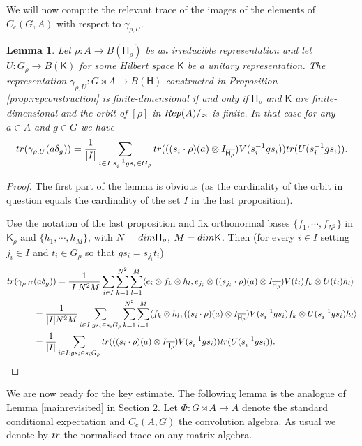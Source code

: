 \documentclass[11 pt, leqno, hidelinks]{amsart}%
\theoremstyle{plain}
\newtheorem{lemma}[theorem]{Lemma}
\numberwithin{equation}{section}
\newcommand{\tr}{\textup{tr}}
\newcommand{\Rep}{\textup{Rep}}
\newcommand{\Hil}{\mathsf{H}}
\newcommand{\Kil}{\mathsf{K}}
\begin{document}
We will now compute the relevant trace of the images of the elements of $C_c(G,A)$ with respect to $\gamma_{\rho,U}$.

\begin{lemma}\label{lem:trace}
	Let $\rho:A \to B(\Hil_\rho)$ be an irreducible representation and let $U:G_\rho \to B(\Kil)$ for some Hilbert space $\Kil$	be a unitary representation. The representation  $\gamma_{\rho,U}:G \rtimes A \to B(\Hil)$ constructed in Proposition \ref{prop:repconstruction} is finite-dimensional if and only if $\Hil_\rho$ and $\Kil$ are finite-dimensional and the orbit of $[\rho]$ in $\Rep(A)/_{\approx}$ is finite. In that case for any $a \in A$ and $g \in G$ we have
	\[ \textup{tr} (\gamma_{\rho,U} (a\delta_g)) = \frac{1}{|I|} \sum_{i \in I: s_i^{-1}gs_i \in G_\rho}
	\textup{tr} (( (s_{i} \cdot \rho)(a) \otimes I_{\overline{\Hil_\rho}})V(s_i^{-1}g s_i))	\textup{tr}(U(s_i^{-1}g s_i)).\]	
\end{lemma}
\begin{proof}
	The first part of the lemma is obvious (as the cardinality of the orbit in question equals the cardinality of the set $I$ in the last proposition).
	
	Use the notation of the last proposition and fix orthonormal bases $\{f_1,\cdots, f_{N^2}\}$ in $\Kil_\rho$ and $\{h_1,\cdots, h_{M}\}$, with $N=\textup{dim } \Hil_\rho$, $M = \textup{dim } \Kil$. Then (for every $i \in I$ setting $j_i\in I$ and $t_i \in G_\rho$ so that $gs_i = s_{j_i}t_i$)
	\begin{align*} \textup{tr} (\gamma_{\rho,U} &(a\delta_g)) =
		\frac{1}{|I|N^2 M} \sum_{i \in I} \sum_{k=1}^{N^2} \sum_{l=1}^M
		\langle e_i \otimes f_k \otimes h_l, e_{j_i} \otimes( (s_{j_i} \cdot \rho)(a) \otimes I_{\overline{\Hil_\rho}})V(t_i)f_k \otimes U(t_i)h_l \rangle
		\\&= 	\frac{1}{|I|N^2 M} \sum_{i \in I: gs_i \in s_i G_\rho}
		\sum_{k=1}^{N^2} \sum_{l=1}^M 	
		\langle f_k \otimes h_l,  ( (s_{i} \cdot \rho)(a) \otimes I_{\overline{\Hil_\rho}})V(s_i^{-1}g s_i)f_k \otimes U(s_i^{-1}g s_i)h_l \rangle
		\\&= \frac{1}{|I|} \sum_{i \in I: gs_i \in s_i G_\rho}
		\textup{tr} (( (s_{i} \cdot \rho)(a) \otimes I_{\overline{\Hil_\rho}})V(s_i^{-1}g s_i))	\textup{tr}(U(s_i^{-1}g s_i)).
	\end{align*}	
	
\end{proof}



We are now ready for the key estimate. The following lemma is the analogue of Lemma \ref{mainrevisited} in Section 2. Let $\Phi:G \rtimes A\to A$ denote the standard conditional expectation and $C_c(A, G)$ the convolution algebra. As usual we denote by $\tr$ the normalised trace on any matrix algebra.
\end{document}
